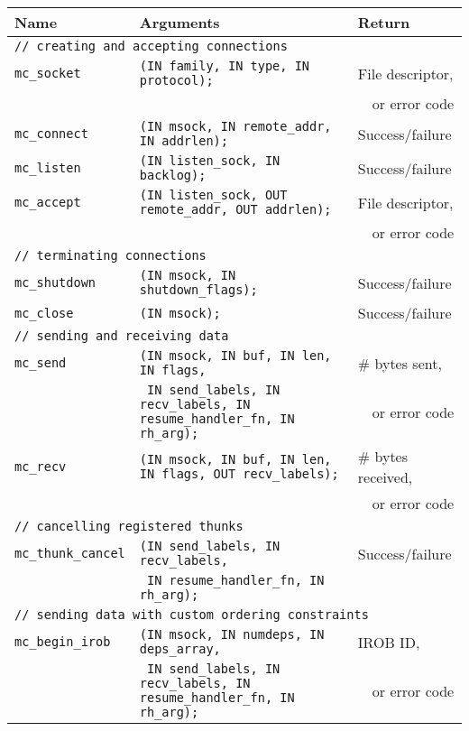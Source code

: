 \documentclass[10pt]{article}
\begin{document}
\begin{figure*}[t]
\begin{small}
\begin{center}
\begin{tabular}{|lll|} \hline
{\bf Name} & {\bf Arguments} & {\bf Return} \\
\hline
\multicolumn{3}{|l|}{\tt // creating and accepting connections} \\
{\tt mc\_socket} & {\tt (IN family, IN type, IN protocol);} & File descriptor,\\
& & ~~or error code\\
{\tt mc\_connect} & {\tt (IN msock, IN remote\_addr, IN addrlen); } & Success/failure\\
{\tt mc\_listen} & {\tt (IN listen\_sock, IN backlog); } & Success/failure\\
{\tt mc\_accept} & {\tt (IN listen\_sock, OUT remote\_addr, OUT addrlen); } & File descriptor,\\
& & ~~or error code\\
\hline
\multicolumn{3}{|l|}{\tt // terminating connections} \\
{\tt mc\_shutdown} & {\tt (IN msock, IN shutdown\_flags);} & Success/failure\\
{\tt mc\_close} & {\tt (IN msock);} & Success/failure\\
\hline
\multicolumn{3}{|l|}{\tt // sending and receiving data} \\
{\tt mc\_send} & {\tt (IN msock, IN buf, IN len, IN flags, }& \# bytes sent,\\
                      & {\tt ~IN send\_labels, IN recv\_labels, IN resume\_handler\_fn, IN rh\_arg); } & ~~or error code\\ 
{\tt mc\_recv} & {\tt (IN msock, IN buf, IN len, IN flags, OUT recv\_labels);}& \# bytes received,\\
 & & ~~or error code\\
\hline
\multicolumn{3}{|l|}{\tt // cancelling registered thunks} \\
{\tt mc\_thunk\_cancel} & {\tt (IN send\_labels, IN recv\_labels, } & Success/failure\\
                       & {\tt ~IN resume\_handler\_fn, IN rh\_arg);}& \\ 
\hline
\multicolumn{3}{|l|}{\tt // sending data with custom ordering constraints} \\
{\tt mc\_begin\_irob} & {\tt (IN msock, IN numdeps, IN deps\_array,}& IROB ID, \\
                      & {\tt ~IN send\_labels, IN recv\_labels, IN resume\_handler\_fn, IN rh\_arg); } & ~~or error code\\ 

\end{tabular}
\end{center}
\end{small}
\end{figure*}
\end{document}
